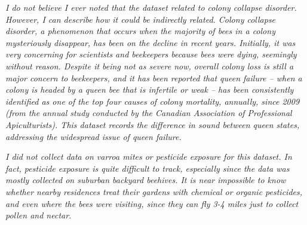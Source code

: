 \documentclass[12pt]{report}
\begin{document}
\par\textit{I do not believe I ever noted that the dataset related to colony collapse disorder. However, I can describe how it could be indirectly related. Colony collapse disorder, a phenomenon that occurs when the majority of bees in a colony mysteriously disappear, has been on the decline in recent years. Initially, it was very concerning for scientists and beekeepers because bees were dying, seemingly without reason. Despite it being not as severe now, overall colony loss is still a major concern to beekeepers, and it has been reported that queen failure -- when a colony is headed by a queen bee that is infertile or weak -- has been consistently identified as one of the top four causes of colony mortality, annually, since 2009 (from the annual study conducted by the Canadian Association of Professional Apiculturists). This dataset records the difference in sound between queen states, addressing the widespread issue of queen failure.}

\par\textit{I did not collect data on varroa mites or pesticide exposure for this dataset. In fact, pesticide exposure is quite difficult to track, especially since the data was mostly collected on suburban backyard beehives. It is near impossible to know whether nearby residences treat their gardens with chemical or organic pesticides, and even where the bees were visiting, since they can fly 3-4 miles just to collect pollen and nectar.}



	\pagebreak
	\printbibliography
	\thispagestyle{empty}
	
\end{document}
